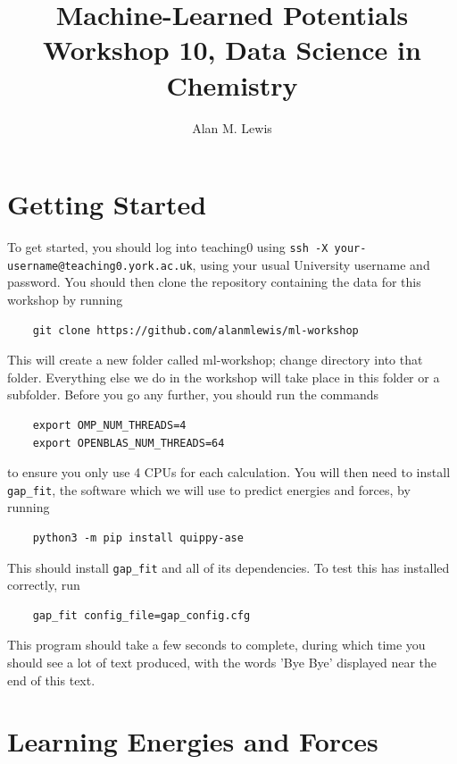 \documentclass{article}
\title{Machine-Learned Potentials \\ Workshop 10, Data Science in Chemistry}
\author{Alan M. Lewis}
\date{}
\begin{document}
\maketitle

\section{Getting Started}

To get started, you should log into teaching0 using \verb|ssh -X your-username@teaching0.york.ac.uk|, using your usual University username and password. You should then clone the repository containing the data for this workshop by running
\begin{Verbatim}
    git clone https://github.com/alanmlewis/ml-workshop
\end{Verbatim}
This will create a new folder called ml-workshop; change directory into that folder. Everything else we do in the workshop will take place in this folder or a subfolder. Before you go any further, you should run the commands
\begin{Verbatim}
    export OMP_NUM_THREADS=4
    export OPENBLAS_NUM_THREADS=64
\end{Verbatim}
to ensure you only use 4 CPUs for each calculation. You will then need to install \verb|gap_fit|, the software which we will use to predict energies and forces, by running
\begin{Verbatim}
    python3 -m pip install quippy-ase
\end{Verbatim}
This should install \verb|gap_fit| and all of its dependencies. To test this has installed correctly, run
\begin{Verbatim}
    gap_fit config_file=gap_config.cfg
\end{Verbatim}
This program should take a few seconds to complete, during which time you should see a lot of text produced, with the words 'Bye Bye' displayed near the end of this text.

\section{Learning Energies and Forces}
\end{document}
